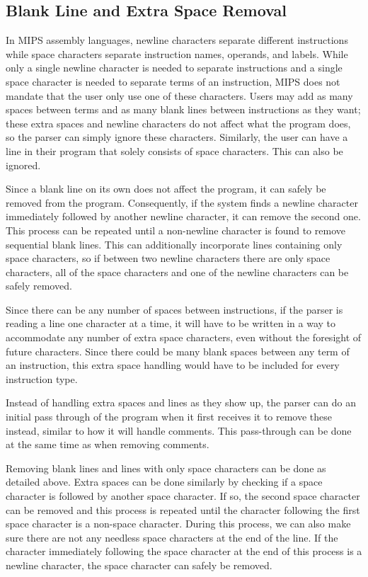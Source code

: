\documentclass[
    paper=letter,
    parskip=half,
    fontsize=12pt,
    titlepage=firstiscover,
    toc=bibliography,
    numbers=endperiod
]{scrartcl}
\begin{document}
\subsection{Blank Line and Extra Space Removal}

In MIPS assembly languages, newline characters separate different
instructions while space characters separate instruction names,
operands, and labels. While only a single newline character is needed to
separate instructions and a single space character is needed to separate
terms of an instruction, MIPS does not mandate that the user only use
one of these characters. Users may add as many spaces between terms and
as many blank lines between instructions as they want; these extra
spaces and newline characters do not affect what the program does, so
the parser can simply ignore these characters. Similarly, the user can
have a line in their program that solely consists of space characters.
This can also be ignored.

Since a blank line on its own does not affect the program, it can safely
be removed from the program. Consequently, if the system finds a newline
character immediately followed by another newline character, it can
remove the second one. This process can be repeated until a non-newline
character is found to remove sequential blank lines. This can
additionally incorporate lines containing only space characters, so if
between two newline characters there are only space characters, all of
the space characters and one of the newline characters can be safely
removed.

Since there can be any number of spaces between instructions, if the
parser is reading a line one character at a time, it will have to be
written in a way to accommodate any number of extra space characters,
even without the foresight of future characters. Since there could be
many blank spaces between any term of an instruction, this extra space
handling would have to be included for every instruction type.

Instead of handling extra spaces and lines as they show up, the parser
can do an initial pass through of the program when it first receives it
to remove these instead, similar to how it will handle comments. This
pass-through can be done at the same time as when removing comments.

Removing blank lines and lines with only space characters can be done as
detailed above. Extra spaces can be done similarly by checking if a
space character is followed by another space character. If so, the
second space character can be removed and this process is repeated until
the character following the first space character is a non-space
character. During this process, we can also make sure there are not any
needless space characters at the end of the line. If the character
immediately following the space character at the end of this process is
a newline character, the space character can safely be removed.
\end{document}
